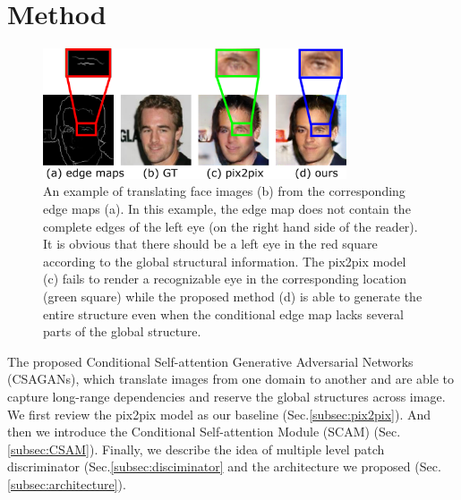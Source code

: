 \section{Method}
\label{sec:method}

%
\begin{figure}
	\includegraphics[width=0.8\textwidth]{figures/example}
	\caption{An example of translating face images (b) from the corresponding edge maps (a). In this example, the edge map does not contain the complete edges of the left eye (on the right hand side of the reader). It is obvious that there should be a left eye in the red square according to the global structural information. The pix2pix model (c) fails to render a recognizable eye in the corresponding location (green square) while the proposed method (d) is able to generate the entire structure even when the conditional edge map lacks several parts of the global structure.}
	\label{fig:example}
\end{figure}
%
The proposed Conditional Self-attention Generative Adversarial Networks (CSAGANs), which translate images from one domain to another and are able to capture long-range dependencies and reserve the global structures across image. We first review the pix2pix model as our baseline (Sec.\ref{subsec:pix2pix}). And then we introduce the Conditional Self-attention Module (SCAM) (Sec. \ref{subsec:CSAM}). Finally, we describe the idea of multiple level patch discriminator (Sec.\ref{subsec:disciminator} and the architecture we proposed (Sec. \ref{subsec:architecture}).
